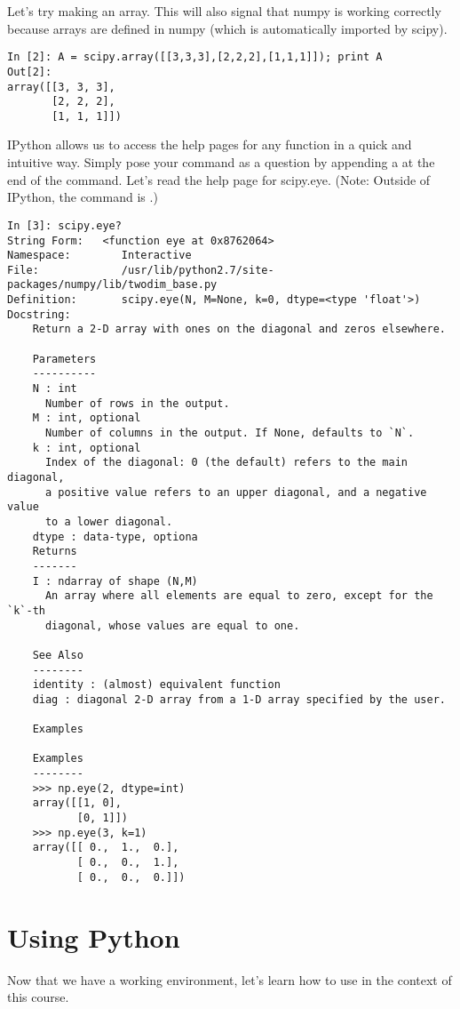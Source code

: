 Let's try making an array.  This will also signal that numpy is working correctly because arrays are defined in numpy (which is automatically imported by scipy).
\begin{lstlisting}
In [2]: A = scipy.array([[3,3,3],[2,2,2],[1,1,1]]); print A
Out[2]:
array([[3, 3, 3],
       [2, 2, 2],
       [1, 1, 1]])
\end{lstlisting}

IPython allows us to access the help pages for any function in a quick and intuitive way.  Simply pose your command as a question by appending a  at the end of the command.  Let's read the help page for scipy.eye. (Note: Outside of IPython, the command is .)
\begin{lstlisting}
In [3]: scipy.eye?
String Form:   <function eye at 0x8762064>
Namespace:        Interactive
File:             /usr/lib/python2.7/site-packages/numpy/lib/twodim_base.py
Definition:       scipy.eye(N, M=None, k=0, dtype=<type 'float'>)
Docstring:
    Return a 2-D array with ones on the diagonal and zeros elsewhere.

    Parameters
    ----------
    N : int
      Number of rows in the output.
    M : int, optional
      Number of columns in the output. If None, defaults to `N`.
    k : int, optional
      Index of the diagonal: 0 (the default) refers to the main diagonal,
      a positive value refers to an upper diagonal, and a negative value
      to a lower diagonal.
    dtype : data-type, optiona
    Returns
    -------
    I : ndarray of shape (N,M)
      An array where all elements are equal to zero, except for the `k`-th
      diagonal, whose values are equal to one.

    See Also
    --------
    identity : (almost) equivalent function
    diag : diagonal 2-D array from a 1-D array specified by the user.

    Examples

    Examples
    --------
    >>> np.eye(2, dtype=int)
    array([[1, 0],
           [0, 1]])
    >>> np.eye(3, k=1)
    array([[ 0.,  1.,  0.],
           [ 0.,  0.,  1.],
           [ 0.,  0.,  0.]])
\end{lstlisting}

\section*{Using Python}
Now that we have a working environment, let's learn how to use in the context of this course.

